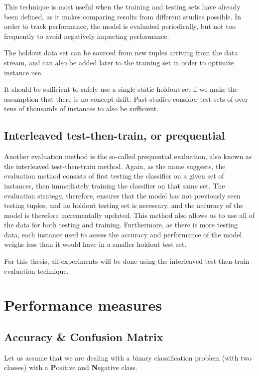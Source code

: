 This technique is most useful when the training and testing sets have already been defined, as it makes comparing results from different studies possible.
In order to track performance, the model is evaluated periodically, but not too frequently to avoid negatively impacting performance.

The holdout data set can be sourced from new tuples arriving from the data stream, and can also be added later to the training set in order to optimize instance use.

It should be sufficient to safely use a single static holdout set if we make the assumption that there is no concept drift. Past studies consider test sets of over tens of thousands of instances to also be sufficient. 

\subsection{Interleaved test-then-train, or prequential}
Another evaluation method is the so-called prequential evaluation, also known as the interleaved test-then-train method. Again, as the name suggests, the evaluation method consists of first testing the classifier on a given set of instances, then immediately training the classifier on that same set. The evaluation strategy, therefore, ensures that the model has not previously seen testing tuples, and no holdout testing set is necessary, and the accuracy of the model is therefore incrementally updated. This method also allows us to use all of the data for both testing and training. Furthermore, as there is more testing data, each instance used to assess the accuracy and performance of the model weighs less than it would have in a smaller holdout test set.

For this thesis, all experiments will be done using the interleaved test-then-train evaluation technique.

\section{Performance measures\label{section:performance_measures}}


\subsection{Accuracy \& Confusion Matrix}
Let us assume that we are dealing with a binary classification problem (with two classes) with a \textbf{P}ositive and \textbf{N}egative class.

